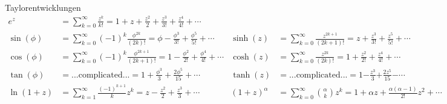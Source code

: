 \begin{Diverses}{Taylorentwicklungen}{}
    \begin{align*}
    e^z &= \sum_{k=0}^{\infty} \frac{z^k}{k!} = 1 + z + \frac{z^2}{2}+ \frac{z^3}{3!}+ \frac{z^4}{4!} + \cdots \\
    \sin(\phi) &= \sum_{k=0}^{\infty} (-1)^k \frac{\phi^{2k}}{(2k)!} = \phi - \frac{\phi^3}{3!} + \frac{\phi^5}{5!} + \cdots &
    \sinh(z) &= \sum_{k=0}^{\infty} \frac{z^{2k+1}}{(2k+1)!} = z + \frac{z^3}{3!} + \frac{z^5}{5!} + \cdots\\
    \cos(\phi) &= \sum_{k=0}^{\infty} (-1)^k \frac{\phi^{2k+1}}{(2k+1)!} = 1 - \frac{\phi^2}{2!} + \frac{\phi^4}{4!} + \cdots &
    \cosh(z) &= \sum_{k=0}^{\infty} \frac{z^{2k}}{(2k)!} = 1 + \frac{z^2}{2!} + \frac{z^4}{4!} + \cdots\\
    \tan(\phi) &= \text{...complicated...} = 1 + \frac{\phi^3}{3} + \frac{2\phi^5}{15} + \cdots&
    \tanh(z) &= \text{...complicated...} = 1 \pmb{-} \frac{z^3}{3} \pmb{+} \frac{2z^5}{15} \pmb{-} \cdots\\
    \ln(1+z) &= \sum_{k=1}^{\infty} \frac{(-1)^{k+1}}{k}z^k = z - \frac{z^2}{2} + \frac{z^3}{3} + \cdots &
    (1+z)^\alpha& = \sum_{k=0}^{\infty}  \binom{\alpha}{k} z^k = 1 + \alpha z + \frac{\alpha(\alpha - 1)}{2!} z ^ 2 + \cdots
    \end{align*}
\end{Diverses}

